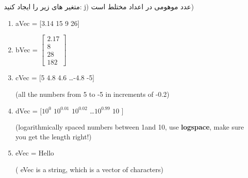 \documentclass{article}
\begin{document}
\clearpage
{}

متغیر های زیر را ایجاد کنید:
j) عدد موهومی در اعداد مختلط است)

\begin{latin}
	\begin{enumerate}
		\item aٰVec = [3.14 15 9 26]
		
		\item bVec = $\begin{bmatrix}
			2.17 \\
			8 \\
			28 \\
			182
		\end{bmatrix}$
		
		\item cVec = [5 4.8 4.6  \dots  -4.8 -5] 
		
		(all the numbers from 5 to -5 in increments of -0.2)
		
		\item dVec = [$10^0$ $10^{0.01}$ $10^{0.02}$ \dots $10^{0.99}$ $10$ ] 
		
		(logarithmically spaced numbers between 1and 10, use \textbf{logspace}, make sure you get the length right!)
		
		\item eVec = Hello 
		
		( eVec is a string, which is a vector of characters)
	\end{enumerate}
\end{latin}

\end{document}
